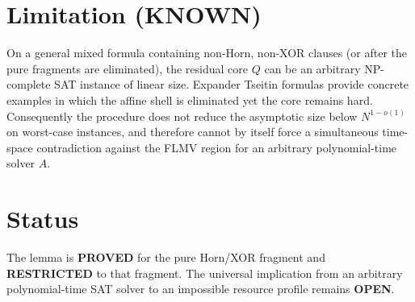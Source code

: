 \documentclass[11pt]{article}
\begin{document}
\section{Limitation (KNOWN)}
On a general mixed formula containing non-Horn, non-XOR clauses (or after the pure fragments are eliminated), the residual core $Q$ can be an arbitrary NP-complete SAT instance of linear size. Expander Tseitin formulas provide concrete examples in which the affine shell is eliminated yet the core remains hard. Consequently the procedure does not reduce the asymptotic size below $N^{1-o(1)}$ on worst-case instances, and therefore cannot by itself force a simultaneous time-space contradiction against the FLMV region for an arbitrary polynomial-time solver $A$.

\section{Status}
The lemma is \textbf{PROVED} for the pure Horn/XOR fragment and \textbf{RESTRICTED} to that fragment. The universal implication from an arbitrary polynomial-time SAT solver to an impossible resource profile remains \textbf{OPEN}.
\end{document}
